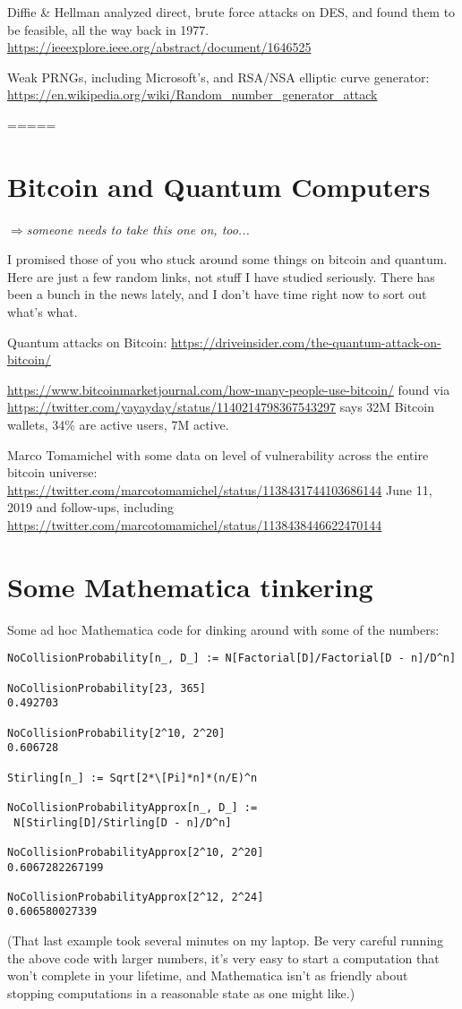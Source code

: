 \documentclass[%
 aip,
 jmp,%
 amsmath,amssymb,
 reprint,%
]{revtex4-1}
\def\comment#1{{\color{ForestGreen}$\Rightarrow${\small\em #1}}}
\begin{document}
Diffie \& Hellman analyzed direct, brute force attacks on DES, and
found them to be feasible, all the way back in 1977.
\url{https://ieeexplore.ieee.org/abstract/document/1646525}

Weak PRNGs, including Microsoft's, and RSA/NSA elliptic curve
generator:
\url{https://en.wikipedia.org/wiki/Random_number_generator_attack}

=====

\appendix

\section{Bitcoin and Quantum Computers}

\comment{someone needs to take this one on, too...}

I promised those of you who stuck around some things on bitcoin and
quantum.  Here are just a few random links, not stuff I have studied
seriously.  There has been a bunch in the news lately, and I don't
have time right now to sort out what's what.

Quantum attacks on Bitcoin:
\url{https://driveinsider.com/the-quantum-attack-on-bitcoin/}

\url{https://www.bitcoinmarketjournal.com/how-many-people-use-bitcoin/}
found via
\url{https://twitter.com/yayayday/status/1140214798367543297}
says 32M Bitcoin wallets, 34\% are active users, 7M active.

Marco Tomamichel with some data on level of vulnerability across the
entire bitcoin universe:
\url{https://twitter.com/marcotomamichel/status/1138431744103686144}
June 11, 2019
and follow-ups, including
\url{https://twitter.com/marcotomamichel/status/1138438446622470144}


\onecolumngrid

\section{Some Mathematica tinkering}

Some ad hoc Mathematica code for dinking around with some of the
numbers:

\begin{verbatim}
NoCollisionProbability[n_, D_] := N[Factorial[D]/Factorial[D - n]/D^n]

NoCollisionProbability[23, 365]
0.492703

NoCollisionProbability[2^10, 2^20]
0.606728

Stirling[n_] := Sqrt[2*\[Pi]*n]*(n/E)^n

NoCollisionProbabilityApprox[n_, D_] := 
 N[Stirling[D]/Stirling[D - n]/D^n]

NoCollisionProbabilityApprox[2^10, 2^20]
0.6067282267199

NoCollisionProbabilityApprox[2^12, 2^24]
0.606580027339
\end{verbatim}
(That last example took several minutes on my laptop.  Be very careful
running the above code with larger numbers, it's very easy to start a
computation that won't complete in your lifetime, and Mathematica
isn't as friendly about stopping computations in a reasonable state as
one might like.)
\end{document}
